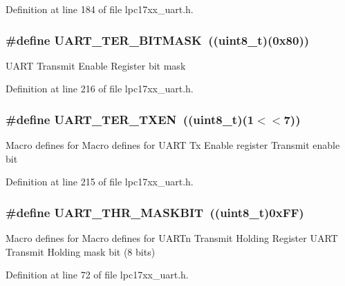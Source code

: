 \-Definition at line 184 of file lpc17xx\-\_\-uart.\-h.

\hypertarget{group___u_a_r_t___private___macros_ga65bbbe4fecd3da46942b07267bf5cd32}{
\subsubsection[{\-U\-A\-R\-T\-\_\-\-T\-E\-R\-\_\-\-B\-I\-T\-M\-A\-S\-K}]{\setlength{\rightskip}{0pt plus 5cm}\#define {\bf \-U\-A\-R\-T\-\_\-\-T\-E\-R\-\_\-\-B\-I\-T\-M\-A\-S\-K}~((uint8\-\_\-t)(0x80))}}\label{group___u_a_r_t___private___macros_ga65bbbe4fecd3da46942b07267bf5cd32}
\-U\-A\-R\-T \-Transmit \-Enable \-Register bit mask 

\-Definition at line 216 of file lpc17xx\-\_\-uart.\-h.

\hypertarget{group___u_a_r_t___private___macros_gaa6e9b1099b787bb65c64d2e07d2fc3cf}{
\subsubsection[{\-U\-A\-R\-T\-\_\-\-T\-E\-R\-\_\-\-T\-X\-E\-N}]{\setlength{\rightskip}{0pt plus 5cm}\#define {\bf \-U\-A\-R\-T\-\_\-\-T\-E\-R\-\_\-\-T\-X\-E\-N}~((uint8\-\_\-t)(1$<$$<$7))}}\label{group___u_a_r_t___private___macros_gaa6e9b1099b787bb65c64d2e07d2fc3cf}
\-Macro defines for \-Macro defines for \-U\-A\-R\-T \-Tx \-Enable register \-Transmit enable bit 

\-Definition at line 215 of file lpc17xx\-\_\-uart.\-h.

\hypertarget{group___u_a_r_t___private___macros_ga1592b78e87967ae6a06756679cfc855e}{
\subsubsection[{\-U\-A\-R\-T\-\_\-\-T\-H\-R\-\_\-\-M\-A\-S\-K\-B\-I\-T}]{\setlength{\rightskip}{0pt plus 5cm}\#define {\bf \-U\-A\-R\-T\-\_\-\-T\-H\-R\-\_\-\-M\-A\-S\-K\-B\-I\-T}~((uint8\-\_\-t)0x\-F\-F)}}\label{group___u_a_r_t___private___macros_ga1592b78e87967ae6a06756679cfc855e}
\-Macro defines for \-Macro defines for \-U\-A\-R\-Tn \-Transmit \-Holding \-Register \-U\-A\-R\-T \-Transmit \-Holding mask bit (8 bits) 

\-Definition at line 72 of file lpc17xx\-\_\-uart.\-h.

